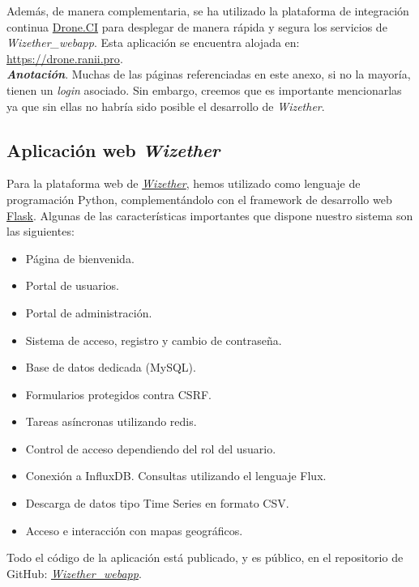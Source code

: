 \documentclass[12pt]{article}
\begin{document}
\noindent Además, de manera complementaria, se ha utilizado la plataforma de integración continua \href{https://www.drone.io/}{Drone.CI} para desplegar de manera rápida y segura los servicios de \textit{Wizether\_webapp}. Esta aplicación se encuentra alojada en: \href{https://drone.ranii.pro}{https://drone.ranii.pro}. \\

\noindent \textit{\textbf{Anotación}}. Muchas de las páginas referenciadas en este anexo, si no la mayoría,  tienen un \textit{login} asociado. Sin embargo, creemos que es importante mencionarlas ya que sin ellas no habría sido posible el desarrollo de \textit{Wizether}.

\subsection{Aplicación web \textit{Wizether}}
\noindent Para la plataforma web de \href{https://wizether.ranii.pro/}{\textit{Wizether}}, hemos utilizado como lenguaje de programación Python, complementándolo con el framework de desarrollo web \href{https://flask.palletsprojects.com/en/1.1.x/}{Flask}. Algunas de las características importantes que dispone nuestro sistema son las siguientes:
\begin{itemize}
	\item Página de bienvenida.
	\item Portal de usuarios.
	\item Portal de administración.
	\item Sistema de acceso, registro y cambio de contraseña.
	\item Base de datos dedicada (MySQL).
	\item Formularios protegidos contra CSRF.
	\item Tareas asíncronas utilizando redis.
	\item Control de acceso dependiendo del rol del usuario.
	\item Conexión a InfluxDB. Consultas utilizando el lenguaje Flux.
	\item Descarga de datos tipo Time Series en formato CSV.
	\item Acceso e interacción con mapas geográficos.
\end{itemize}

\noindent Todo el código de la aplicación está publicado, y es público, en el repositorio de GitHub: \href{https://github.com/Raniita/wizether_webapp}{\textit{Wizether\_webapp}}.\\
\end{document}
